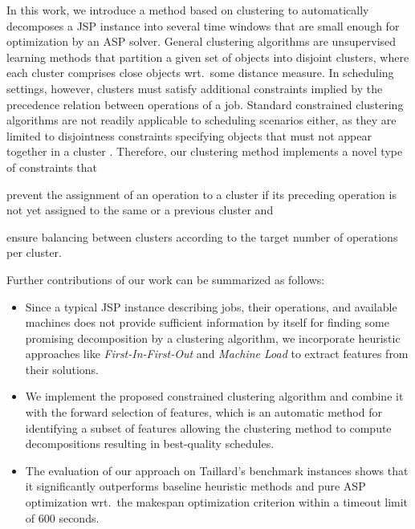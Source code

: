 \documentclass[runningheads]{llncs}
\begin{document}

In this work, we introduce a method based on clustering to automatically decomposes a JSP instance into several time windows that are small enough for optimization by an ASP solver.
General clustering algorithms are unsupervised learning methods that partition a given set of objects into disjoint clusters, where each cluster comprises close objects wrt.\ some distance measure. 
In scheduling settings, however, clusters must satisfy additional constraints implied by the precedence relation between operations of a job. Standard constrained clustering algorithms are not readily applicable to scheduling scenarios either, as they are limited to disjointness constraints specifying objects that must not appear together in a cluster \cite{zhang2019framework,wagstaff2001constrained,ding2020unified}. 
Therefore, our clustering method implements a novel type of constraints that
\begin{enumerate*}[label=\emph{(\roman*)}]
  \item prevent the assignment of an operation to a cluster if its preceding operation is not yet assigned to the same or a previous cluster and
  \item ensure balancing between clusters according to the target number of operations per cluster.
\end{enumerate*}
Further contributions of our work can be summarized as follows:
\begin{itemize}
  \item Since a typical JSP instance describing jobs, their operations, and available machines does not provide sufficient information by itself for finding some promising decomposition by a clustering algorithm, we incorporate heuristic approaches like \textit{First-In-First-Out} and \textit{Machine Load} to extract features from their solutions.
  \item We implement the proposed constrained clustering algorithm and combine it with the forward selection of features, which is an automatic method for identifying a subset of features allowing the clustering method to compute decompositions resulting in best-quality schedules.
  \item The evaluation of our approach on Taillard's benchmark instances \cite{taillard1993benchmarks} shows that it significantly outperforms baseline heuristic methods and pure ASP optimization wrt.\ the makespan optimization criterion within a timeout limit of 600 seconds.
\end{itemize}
\end{document}
